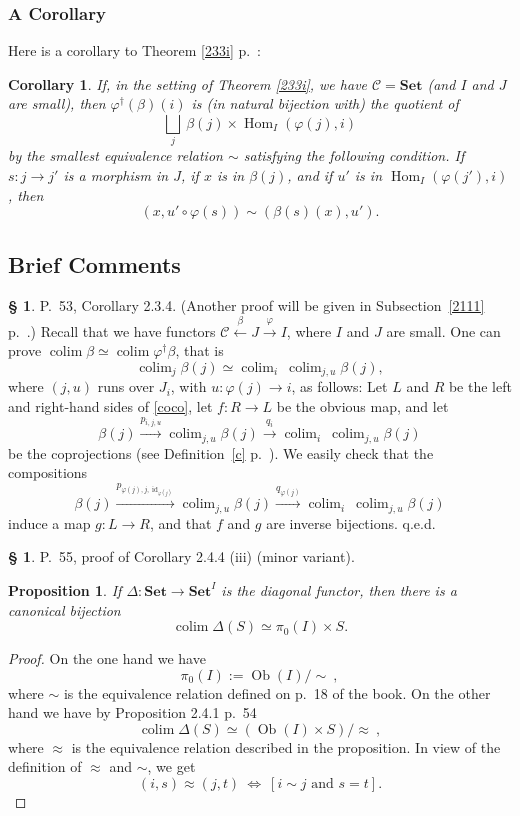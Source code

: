 \documentclass[12pt]{article}
\newtheorem{prop}[thm]{Proposition}
\newtheorem{cor}[thm]{Corollary}
\theoremstyle{remark}
\theoremstyle{definition}
\newtheorem{s}[thm]{\S}
\newcommand{\C}{\mathcal C}
\newcommand{\Set}{\mathbf{Set}}
\newcommand{\mv}{ (minor variant)}
\newcommand{\bc}{\subsection{Brief Comments}}
\newcommand{\ssi}{\Leftrightarrow}%
\DeclareMathOperator*{\coli}{colim}
\DeclareMathOperator*{\co}{colim}
\DeclareMathOperator{\id}{id}
\DeclareMathOperator{\Hom}{Hom}%
\DeclareMathOperator{\Ob}{Ob}
\begin{document}
\subsubsection{A Corollary}
%
Here is a corollary to Theorem \ref{233i} p.~\pageref{233i}:
\begin{cor}\label{c233i}
If, in the setting of Theorem \ref{233i}, we have $\C=\Set$ (and $I$ and $J$ are small), then $\varphi^\dagger(\beta)(i)$ is (in natural bijection with) the quotient of 
$$
\bigsqcup_j\ \beta(j)\times\Hom_I(\varphi(j),i) 
$$ 
by the smallest equivalence relation $\sim$ satisfying the following condition. If $s:j\to j'$ is a morphism in $J$, if $x$ is in $\beta(j)$, and if $u'$ is in $\Hom_I(\varphi(j'),i)$, then 
$$
(x,u'\circ\varphi(s))\sim(\beta(s)(x),u'). 
$$
\end{cor}
%
%
\bc
%
\begin{s} P.~53, Corollary 2.3.4. (Another proof will be given in Subsection~\ref{2111} p.~\pageref{2111}.) Recall that we have functors $\C\xleftarrow\beta J\xrightarrow\varphi I$, where $I$ and $J$ are small. One can prove $\co\beta\simeq\co\varphi^\dagger\beta$, that is 
%
\begin{equation}\label{coco}
\co_j\beta(j)\simeq\co_i\ \co_{j,u}\beta(j),
\end{equation} 
%
where $(j,u)$ runs over $J_i$, with $u:\varphi(j)\to i$, as follows: Let $L$ and $R$ be the left and right-hand sides of \eqref{coco}, let $f:R\to L$ be the obvious map, and let
$$ 
\beta(j)\xrightarrow{p_{i,j,u}}\co_{j,u}\beta(j)\xrightarrow{q_i}\co_i\ \co_{j,u}\beta(j)
$$ 
be the coprojections (see Definition~\ref{c} p.~\pageref{c}). We easily check that the compositions 
$$
\beta(j)\xrightarrow{p_{\varphi(j),j,\id_{\varphi(j)}}}\co_{j,u}\beta(j)\xrightarrow{q_{\varphi(j)}}\co_i\ \co_{j,u}\beta(j)
$$ 
induce a map $g:L\to R$, and that $f$ and $g$ are inverse bijections. q.e.d.
\end{s}
%
%
\begin{s} 
P.~55, proof of Corollary 2.4.4 (iii)\mv.
%
\begin{prop}\label{244}
If $\Delta:\Set\to\Set^I$ is the diagonal functor, then there is a canonical bijection
$$
\coli\Delta(S)\simeq\pi_0(I)\times S.
$$
\end{prop} 
%
\begin{proof}
On the one hand we have 
$$
\pi_0(I):=\Ob(I)/\!\!\sim\ , 
$$
where $\sim$ is the equivalence relation defined on p.~18 of the book. On the other hand we have by Proposition 2.4.1 p.~54
$$
\coli\Delta(S)\simeq(\Ob(I)\times S)/\!\!\approx\ ,
$$
where $\approx$ is the equivalence relation described in the proposition. In view of the definition of $\approx$ and $\sim$, we get 
$$
(i,s)\approx(j,t)\ \ssi\ [i\sim j\text{ and }s=t].
$$ 
\end{proof}
\end{s}
%
%
\end{document}
